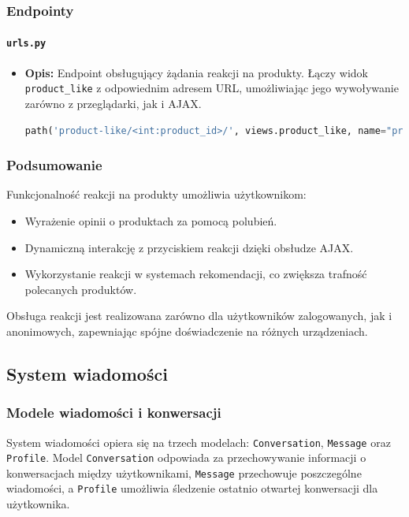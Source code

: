 \documentclass[12pt,a4paper,oneside]{article}
\theoremstyle{definition}
\numberwithin{equation}{section}
\begin{document}
\subsubsection{Endpointy}

\paragraph{\texttt{urls.py}}
\begin{itemize}
    \item \textbf{Opis:} Endpoint obsługujący żądania reakcji na produkty. Łączy widok \texttt{product\_like} z odpowiednim adresem URL, umożliwiając jego wywoływanie zarówno z przeglądarki, jak i AJAX.
        \begin{lstlisting}[language=Python, caption=Endpoint dla widoku \texttt{product\_like}]
    path('product-like/<int:product_id>/', views.product_like, name="product_like"),
        \end{lstlisting}
\end{itemize}


\subsubsection{Podsumowanie}
Funkcjonalność reakcji na produkty umożliwia użytkownikom:
\begin{itemize}
    \item Wyrażenie opinii o produktach za pomocą polubień.
    \item Dynamiczną interakcję z przyciskiem reakcji dzięki obsłudze AJAX.
    \item Wykorzystanie reakcji w systemach rekomendacji, co zwiększa trafność polecanych produktów.
\end{itemize}
Obsługa reakcji jest realizowana zarówno dla użytkowników zalogowanych, 
jak i anonimowych, zapewniając spójne doświadczenie na różnych urządzeniach.

% 
% 
\clearpage
\subsection{System wiadomości}
\subsubsection{Modele wiadomości i konwersacji}
System wiadomości opiera się na trzech modelach: \texttt{Conversation}, \texttt{Message} oraz \texttt{Profile}. Model \texttt{Conversation} odpowiada za przechowywanie informacji o konwersacjach między użytkownikami, \texttt{Message} przechowuje poszczególne wiadomości, a \texttt{Profile} umożliwia śledzenie ostatnio otwartej konwersacji dla użytkownika.
\end{document}
